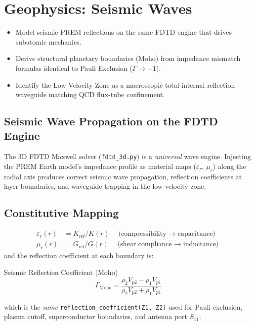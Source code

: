 
\chapter{Geophysics: Seismic Waves}
\label{ch:geophysics}


\begin{objectivebox}
\begin{itemize}
    \item Model seismic PREM reflections on the same FDTD engine that drives subatomic mechanics.
    \item Derive structural planetary boundaries (Moho) from impedance mismatch formulas identical to Pauli Exclusion ($\Gamma \to -1$\gammaundeclared{}).
    \item Identify the Low-Velocity Zone as a macroscopic total-internal reflection waveguide matching QCD flux-tube confinement.
\end{itemize}
\end{objectivebox}

\section{Seismic Wave Propagation on the FDTD Engine}
\label{sec:seismic_fdtd_bridge}

The 3D FDTD Maxwell solver (\texttt{fdtd\_3d.py}) is a \textit{universal}
wave engine.  Injecting the PREM Earth model's impedance profile as
material maps ($\varepsilon_r$, $\mu_r$) along the radial axis
produces correct seismic wave propagation, reflection coefficients
at layer boundaries, and waveguide trapping in the low-velocity zone.

\section{Constitutive Mapping}

\begin{align}
    \varepsilon_r(r) &= K_{\text{ref}} / K(r)
    \quad\text{(compressibility $\to$ capacitance)} \\
    \mu_r(r) &= G_{\text{ref}} / G(r)
    \quad\text{(shear compliance $\to$ inductance)}
\end{align}
and the reflection coefficient at each boundary is:
\begin{resultbox}{Seismic Reflection Coefficient (Moho)}
\begin{equation}
    \Gamma_{\text{Moho}} = \frac{\rho_2 V_{p2} - \rho_1 V_{p1}}
    {\rho_2 V_{p2} + \rho_1 V_{p1}}
\end{equation}
\end{resultbox}
which is the \textit{same} \texttt{reflection\_coefficient(Z1, Z2)}
used for Pauli exclusion, plasma cutoff, superconductor boundaries,
and antenna port $S_{11}$.

